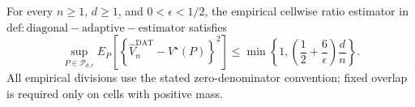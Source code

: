 For every \(n\ge1\), \(d\ge1\), and \(0<\epsilon<1/2\), the empirical cellwise ratio estimator in \(\mathrm{def:diagonal-adaptive-estimator}\) satisfies
\[
 \sup_{P\in\mathcal P_{d,\epsilon}}
 E_P\!\left[
  \left\{\widehat V_n^{\mathrm{DAT}}-V^\star(P)\right\}^2
 \right]
 \le
 \min\!\left\{1,
  \left(\frac12+\frac6\epsilon\right)\frac dn
 \right\}.
\]
All empirical divisions use the stated zero-denominator convention; fixed overlap is required only on cells with positive mass.